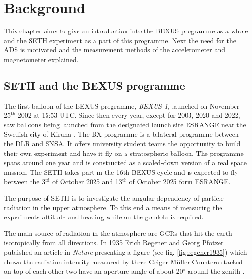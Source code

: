 \chapter{Background \label{ch:background}}
This chapter aims to give an introduction into the \acf{BEXUS} programme as a whole and the \acf{SETH} experiment as a part of this programme. Next the need for the \acf{ADS} is motivated and the measurement methods of the accelerometer and magnetometer explained.

\section{\acs{SETH} and the \acs{BEXUS} programme \label{sec:bg:seth_and_bx_programme}}

The first balloon of the \ac{BEXUS} programme, \textit{BEXUS 1}, launched on November 25$^{\mathrm{th}}$ 2002 at 15:53 UTC. Since then every year, except for 2003, 2020 and 2022, saw balloons being launched from the designated launch site \ac{ESRANGE} near the Swedish city of Kiruna \cite{IAC-08.E.1.1.4}\cite{bexus-campaign-history}.
The \acf{BX} programme is a bilateral programme between the \acf{DLR} and \acf{SNSA}. It offers university student teams the opportunity to build their own experiment and have it fly on a stratospheric balloon. The programme spans around one year and is constructed as a scaled-down version of a real space mission. The \acf{SETH} takes part in the 16th \ac{BEXUS} cycle and is expected to fly between the 3$^\mathrm{rd}$ of October 2025 and 13$^\mathrm{th}$ of October 2025 form \ac{ESRANGE}.

The purpose of \ac{SETH} is to investigate the angular dependency of particle radiation in the upper atmosphere. To this end a means of measuring the experiments attitude and heading while on the gondola is required.

The main source of radiation in the atmosphere are \acp{GCR} that hit the earth isotropically from all directions. In 1935 Erich Regener and Georg Pfotzer published an article in \textit{Nature} presenting a figure (see fig. \ref{fig:regener1935}) which shows the radiation intensity measured by three Geiger-Müller Counters stacked on top of each other two have an aperture angle of about 20$^\circ$ around the zenith \cite{regener-pfotzer-1935}.

